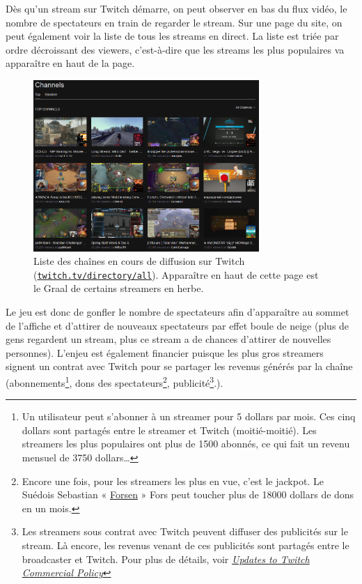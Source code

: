 \documentclass[a4paper]{article}
\begin{document}
Dès qu'un stream sur Twitch démarre, on peut observer en bas du flux vidéo, le nombre de spectateurs en train de regarder le stream. Sur une page du site, on peut également voir la liste de tous les streams en direct. La liste est triée par ordre décroissant des viewers, c'est-à-dire que les streams les plus populaires va apparaître en haut de la page.


\begin{figure}[!h]
	\centering
	\includegraphics[height=6.5cm]{channels.png}
	\caption{Liste des chaînes en cours de diffusion sur Twitch (\href{https://www.twitch.tv/directory/all}{\texttt{twitch.tv/directory/all}}). Apparaître en haut de cette page est le Graal de certains streamers en herbe.}
\end{figure}

Le jeu est donc de gonfler le nombre de spectateurs afin d'apparaître au sommet de l'affiche et d'attirer de nouveaux spectateurs par effet boule de neige (plus de gens regardent un stream, plus ce stream a de chances d'attirer de nouvelles personnes). L'enjeu est également financier puisque les plus gros streamers signent un contrat avec Twitch pour se partager les revenus générés par la chaîne (abonnements\footnote{Un utilisateur peut s'abonner à un streamer pour 5 dollars par mois. Ces cinq dollars sont partagés entre le streamer et Twitch (moitié-moitié). Les streamers les plus populaires ont plus de 1500 abonnés, ce qui fait un revenu mensuel de 3750 dollars\ldots}, dons des spectateurs\footnote{Encore une fois, pour les streamers les plus en vue, c'est le jackpot. Le Suédois Sebastian « \href{https://www.twitch.tv/forsenlol}{Forsen} » Fors peut toucher plus de 18000 dollars de dons en un mois.}, publicité\footnote{Les streamers sous contrat avec Twitch peuvent diffuser des publicités sur le stream. Là encore, les revenus venant de ces publicités sont partagés entre le broadcaster et Twitch. Pour plus de détails, voir \href{https://blog.twitch.tv/updates-to-twitch-commercial-policy-a35f5ce89afa}{\textit{Updates to Twitch Commercial Policy}}}.).
\end{document}

